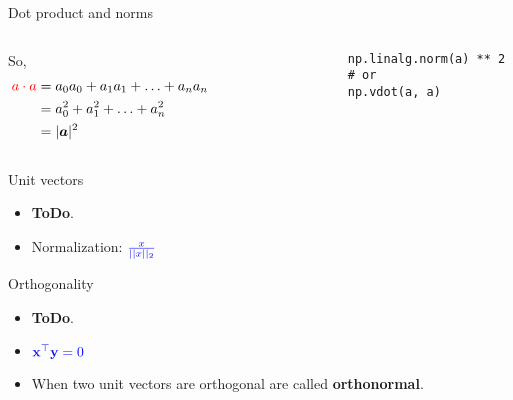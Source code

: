 \documentclass[handout]{beamer}
\begin{document}
\begin{frame}[fragile]{Dot product and norms}
    \begin{columns}
        \begin{column}{0.5\textwidth}
            So,
            \begin{align*}
                \textcolor{red}{a \cdot a} &= a_0a_0 + a_1a_1 + \ldots + a_na_n \\
                                           &= a_0^2  + a_1^2  + \ldots + a_n^2 \\
                                           &= |\boldsymbol{a}|^2
            \end{align*}
        \end{column}
        \begin{column}{0.5\textwidth}
            \begin{alertblock}{}
                \begin{lstlisting}
                np.linalg.norm(a) ** 2
                # or 
                np.vdot(a, a)
                \end{lstlisting}
            \end{alertblock}
        \end{column}
    \end{columns}
\end{frame}

\begin{frame}[fragile]{Unit vectors}
    \begin{itemize}
        \item \textbf{ToDo}.
        \item Normalization: $\textcolor{blue}{\frac{x}{||x||_2}}$
    \end{itemize}
\end{frame}

\begin{frame}[fragile]{Orthogonality}
    \begin{itemize}
        \item \textbf{ToDo}.
        \item $\textcolor{blue}{\bold{x}^\top\bold{y} = 0}$
        \item When two unit vectors are orthogonal are called \textbf{orthonormal}.
    \end{itemize}
\end{frame}
\end{document}
